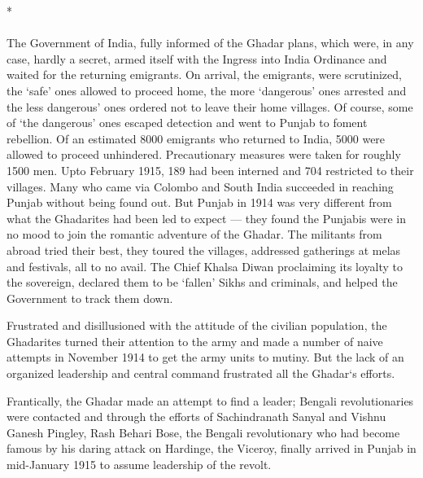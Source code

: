 \begin{center}*\end{center}

\paragraph*{}

The Government of India, fully informed of the Ghadar plans, which were, in any case, hardly a secret, armed itself with the Ingress into India Ordinance and waited for the returning emigrants. On arrival, the emigrants, were scrutinized, the `safe' ones allowed to proceed home, the more `dangerous' ones arrested and the less dangerous' ones ordered not to leave their home villages. Of course, some of `the dangerous' ones escaped detection and went to Punjab to foment rebellion. Of an estimated 8000 emigrants who returned to India, 5000 were allowed to proceed unhindered. Precautionary measures were taken for roughly 1500 men. Upto February 1915, 189 had been interned and 704 restricted to their villages. Many who came via Colombo and South India succeeded in reaching Punjab without being found out. But Punjab in 1914 was very different from what the Ghadarites had been led to expect --- they found the Punjabis were in no mood to join the romantic adventure of the Ghadar. The militants from abroad tried their best, they toured the villages, addressed gatherings at melas and festivals, all to no avail. The Chief Khalsa Diwan proclaiming its loyalty to the sovereign, declared them to be `fallen' Sikhs and criminals, and helped the Government to track them down.

Frustrated and disillusioned with the attitude of the civilian population, the Ghadarites turned their attention to the army and made a number of naive attempts in November 1914 to get the army units to mutiny. But the lack of an organized leadership and central command frustrated all the Ghadar`s efforts.

Frantically, the Ghadar made an attempt to find a leader; Bengali revolutionaries were contacted and through the efforts of Sachindranath Sanyal and Vishnu Ganesh Pingley, Rash Behari Bose, the Bengali revolutionary who had become famous by his daring attack on Hardinge, the Viceroy, finally arrived in Punjab in mid-January 1915 to assume leadership of the revolt.

